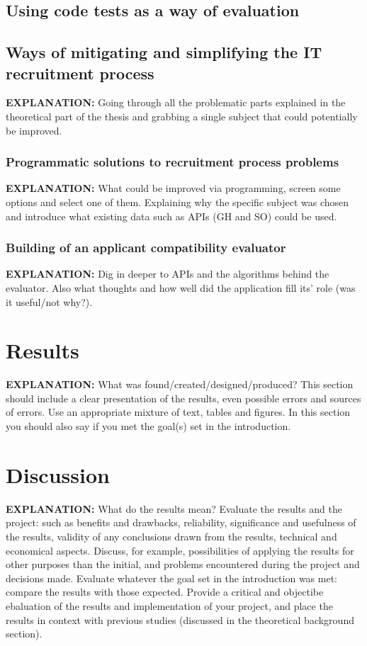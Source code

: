 \documentclass[11pt,a4paper,oneside,article]{memoir}
\begin{document}
\section{Using code tests as a way of evaluation}
\section{Ways of mitigating and simplifying the IT recruitment process}
\textbf{EXPLANATION:} Going through all the problematic parts explained in the theoretical part of the thesis and grabbing a single subject that could potentially be improved.

\subsection{Programmatic solutions to recruitment process problems}
\textbf{EXPLANATION:} What could be improved via programming, screen some options and select one of them. Explaining why the specific subject was chosen and introduce what existing data such as APIs (GH and SO) could be used.

\subsection{Building of an applicant compatibility evaluator}
\textbf{EXPLANATION:} Dig in deeper to APIs and the algorithms behind the evaluator. Also what thoughts and how well did the application fill its’ role (was it useful/not why?).
\chapter{Results}
\textbf{EXPLANATION:} What was found/created/designed/produced? This section should include a clear presentation of the results, even possible errors and sources of errors. Use an appropriate mixture of text, tables and figures. In this section you should also say if you met the goal(s) set in the introduction.
\chapter{Discussion}
\textbf{EXPLANATION:} What do the results mean? Evaluate the results and the project: such as benefits and drawbacks, reliability, significance and usefulness of the results, validity of any conclusions drawn from the results, technical and economical aspects. Discuss, for example, possibilities of applying the results for other purposes than the initial, and problems encountered during the project and decisions made. Evaluate whatever the goal set in the introduction was met: compare the results with those expected. Provide a critical and objectibe ebaluation of the results and implementation of your project, and place the results in context with previous studies (discussed in the theoretical background section).
\end{document}
